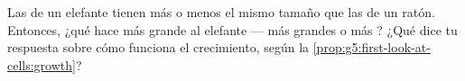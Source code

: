 \begin{exercise}[$\star\star\star$]\label{exo:g5:first-look-at-cells:11}
Las  de un elefante tienen más o menos el mismo tamaño que las
de un ratón. Entonces, ¿qué hace más grande al elefante --- 
más grandes o más ? ¿Qué dice tu respuesta sobre cómo funciona
el crecimiento, según la \cref{prop:g5:first-look-at-cells:growth}?
\end{exercise}
